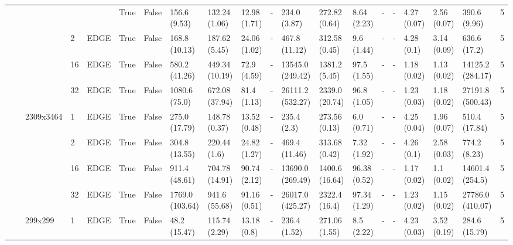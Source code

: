 \begin{tabular}{lllllllllllllllllllr}
                  &      &           &    &      & True &  False &     156.6 (9.53) &    132.24 (1.06) &  12.98 (1.71) &          - &       234.0 (3.87) &   272.82 (0.64) &   8.64 (2.23) &           - &         - &   4.27 (0.07) &      2.56 (0.07) &       390.6 (9.96) &      5 \\
                  &      &           & 2  & EDGE & True &  False &    168.8 (10.13) &    187.62 (5.45) &  24.06 (1.02) &          - &      467.8 (11.12) &   312.58 (0.45) &    9.6 (1.44) &           - &         - &    4.28 (0.1) &      3.14 (0.09) &       636.6 (17.2) &      5 \\
                  &      &           & 16 & EDGE & True &  False &    580.2 (41.26) &   449.34 (10.19) &   72.9 (4.59) &          - &   13545.0 (249.42) &   1381.2 (5.45) &   97.5 (1.55) &           - &         - &   1.18 (0.02) &      1.13 (0.02) &   14125.2 (284.17) &      5 \\
                  &      &           & 32 & EDGE & True &  False &    1080.6 (75.0) &   672.08 (37.94) &   81.4 (1.13) &          - &   26111.2 (532.27) &  2339.0 (20.74) &   96.8 (1.05) &           - &         - &   1.23 (0.03) &      1.18 (0.02) &   27191.8 (500.43) &      5 \\
                  &      & 2309x3464 & 1  & EDGE & True &  False &    275.0 (17.79) &    148.78 (0.37) &  13.52 (0.48) &          - &        235.4 (2.3) &   273.56 (0.13) &    6.0 (0.71) &           - &         - &   4.25 (0.04) &      1.96 (0.07) &      510.4 (17.84) &      5 \\
                  &      &           & 2  & EDGE & True &  False &    304.8 (13.55) &     220.44 (1.6) &  24.82 (1.27) &          - &      469.4 (11.46) &   313.68 (0.42) &   7.32 (1.92) &           - &         - &    4.26 (0.1) &      2.58 (0.03) &       774.2 (8.23) &      5 \\
                  &      &           & 16 & EDGE & True &  False &    911.4 (48.61) &   704.78 (14.91) &  90.74 (2.12) &          - &   13690.0 (269.49) &  1400.6 (16.64) &  96.38 (0.52) &           - &         - &   1.17 (0.02) &       1.1 (0.02) &    14601.4 (254.5) &      5 \\
                  &      &           & 32 & EDGE & True &  False &  1769.0 (103.64) &    941.6 (55.68) &  91.16 (0.51) &          - &   26017.0 (425.27) &   2322.4 (16.4) &  97.34 (1.29) &           - &         - &   1.23 (0.02) &      1.15 (0.02) &   27786.0 (410.07) &      5 \\
                  &      & 299x299 & 1  & EDGE & True &  False &     48.2 (15.47) &    115.74 (2.29) &   13.18 (0.8) &          - &       236.4 (1.52) &   271.06 (1.55) &    8.5 (2.22) &           - &         - &   4.23 (0.03) &      3.52 (0.19) &      284.6 (15.79) &      5 \\

\end{tabular}
